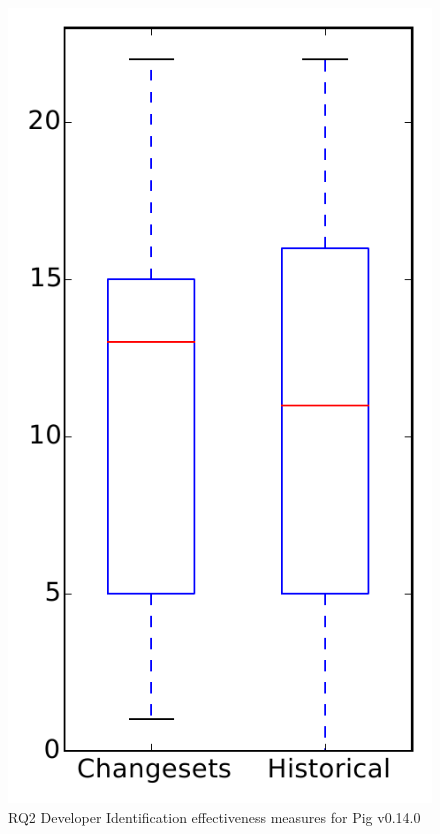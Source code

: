 
\begin{figure}
\centering
\includegraphics[height=0.4\textheight]{figures/dit/rq2_pig}
\caption{RQ2 Developer Identification effectiveness measures for Pig v0.14.0}
\label{fig:dit:rq2:pig}
\end{figure}
